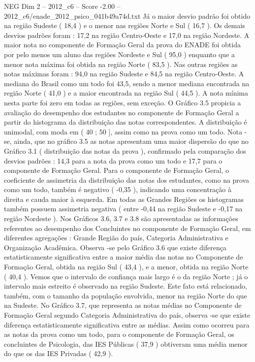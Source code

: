 \begin{textsample}{NEG Dim 2 – 2012\_c6 – Score -2.00 – 2012\_c6/enade\_2012\_psico\_041b49a74d.txt}
Já o maior desvio padrão foi obtido na região Sudeste ( 18,4 ) e o menor nas regiões Norte e Sul ( 16,7 ).
Os demais desvios padrões foram : 17,2 na região Centro-Oeste e 17,0 na região Nordeste.
A maior nota no componente de Formação Geral da prova do ENADE foi obtida por pelo menos um aluno das regiões Nordeste e Sul ( 95,0 ) enquanto que a menor nota máxima foi obtida na região Norte ( 83,5 ).
Nas outras regiões as notas máximas foram : 94,0 na região Sudeste e 84,5 na região Centro-Oeste.
A mediana do Brasil como um todo foi 43,5, sendo a menor mediana encontrada na região Norte ( 41,0 ) e a maior encontrada na região Sul ( 44,5 ).
A nota mínima nesta parte foi zero em todas as regiões, sem exceção.
O Gráfico 3.5 propicia a avaliação do desempenho dos estudantes no componente de Formação Geral a partir do histograma da distribuição das notas correspondentes.
A distribuição é unimodal, com moda em ( 40 ; 50 ], assim como na prova como um todo.
Nota -se, ainda, que no gráfico 3.5 as notas apresentam uma maior dispersão do que no Gráfico 3.1 ( distribuição das notas da prova ), confirmado pela comparação dos desvios padrões : 14,3 para a nota da prova como um todo e 17,7 para o componente de Formação Geral.
Para o componente de Formação Geral, o coeficiente de assimetria da distribuição das notas dos estudantes, como na prova como um todo, também é negativo ( -0,35 ), indicando uma concentração à direita e cauda maior à esquerda.
Em todas as Grandes Regiões os histogramas também possuem assimetria negativa ( entre -0,44 na região Sudeste e -0,17 na região Nordeste ).
Nos Gráficos 3.6, 3.7 e 3.8 são apresentadas as informações referentes ao desempenho dos Concluintes no componente de Formação Geral, em diferentes agregações : Grande Região do país, Categoria Administrativa e Organização Acadêmica.
Observa -se pelo Gráfico 3.6 que existe diferença estatisticamente significativa entre a maior média das notas no Componente de Formação Geral, obtida na região Sul ( 43,4 ), e a menor, obtida na região Norte ( 40,4 ).
Vemos que o intervalo de confiança mais largo é o da região Norte ; já o intervalo mais estreito é observado na região Sudeste.
Este fato está relacionado, também, com o tamanho da população envolvida, menor na região Norte do que na Sudeste.
No Gráfico 3.7, que representa as notas médias no Componente de Formação Geral segundo Categoria Administrativa do país, observa -se que existe diferença estatisticamente significativa entre as médias.
Assim como ocorreu para as notas da prova como um todo, para o componente de Formação Geral, os concluintes de Psicologia, das IES Públicas ( 37,9 ) obtiveram uma média menor do que os das IES Privadas ( 42,9 ).

\end{textsample}
